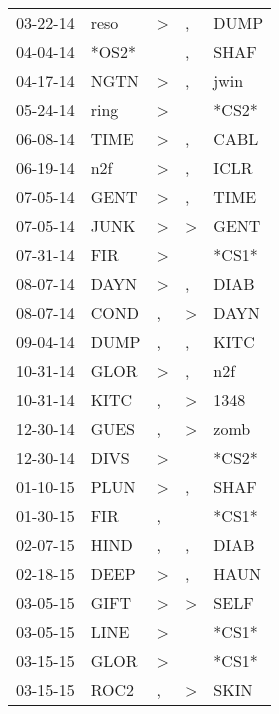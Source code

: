 \begin{supertabular}{lllll}
 03-22-14 &   reso &     \textgreater &                , &   DUMP \\
 04-04-14 &  *OS2* &                  &                , &   SHAF \\
 04-17-14 &   NGTN &     \textgreater &                , &   jwin \\
 05-24-14 &   ring &     \textgreater &                  &  *CS2* \\
 06-08-14 &   TIME &     \textgreater &                , &   CABL \\
 06-19-14 &    n2f &     \textgreater &                , &   ICLR \\
 07-05-14 &   GENT &     \textgreater &                , &   TIME \\
 07-05-14 &   JUNK &     \textgreater &     \textgreater &   GENT \\
 07-31-14 &    FIR &     \textgreater &                  &  *CS1* \\
 08-07-14 &   DAYN &     \textgreater &                , &   DIAB \\
 08-07-14 &   COND &                , &     \textgreater &   DAYN \\
 09-04-14 &   DUMP &                , &                , &   KITC \\
 10-31-14 &   GLOR &     \textgreater &                , &    n2f \\
 10-31-14 &   KITC &                , &     \textgreater &   1348 \\
 12-30-14 &   GUES &                , &     \textgreater &   zomb \\
 12-30-14 &   DIVS &     \textgreater &                  &  *CS2* \\
 01-10-15 &   PLUN &     \textgreater &                , &   SHAF \\
 01-30-15 &    FIR &                , &                  &  *CS1* \\
 02-07-15 &   HIND &                , &                , &   DIAB \\
 02-18-15 &   DEEP &     \textgreater &                , &   HAUN \\
 03-05-15 &   GIFT &     \textgreater &     \textgreater &   SELF \\
 03-05-15 &   LINE &     \textgreater &                  &  *CS1* \\
 03-15-15 &   GLOR &     \textgreater &                  &  *CS1* \\
 03-15-15 &   ROC2 &                , &     \textgreater &   SKIN \\

\end{supertabular}
